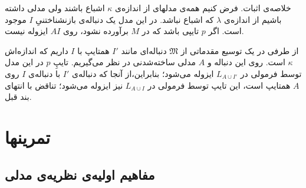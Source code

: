 \documentclass[12pt,a4paper]{report}
\theoremstyle{colorhead}
\begin{document}
	\begin{framed}
	خلاصه‌ی اثبات. فرض کنیم همه‌ی مدلهای از اندازه‌ی
	$\kappa$
	اشباع باشند ولی مدلی داشته باشیم از اندازه‌ی
	$\lambda$
که اشباع نباشد.
در این مدل یک دنباله‌ی بازنشناختنیِ 
$I$
موجود است. 
اگر
$p$
تایپی باشد که در
$M$
برآورده نشود، روی
$AI$
ایزوله نیست. 
\par 
از طرفی در یک توسیع مقدماتی از
$\mathfrak{M}$
دنباله‌ای
مانند 
$I'$
 همتایپ با
$I$
داریم که اندازه‌اش
$\kappa$
است. روی این دنباله و 
$A$
مدلی ساخته‌شدنی در نظر می‌گیریم. 
تایپِ
$p$
در این مدل توسط فرمولی در 
$L_{A\cup I'}$
ایزوله می‌شود؛
بنابراین،از آنجا که دنباله‌ی 
$I'$
با دنباله‌ی
$I$
روی 
$A$
همتایپ است،
 این تایپ توسط فرمولی در 
$L_{A\cup I}$
نیز
ایزوله می‌شود؛ تناقض با انتهای بند قبل.
	\end{framed}
	\chapter{تمرینها}
	\section{مفاهیم اولیه‌ی نظریه‌ی مدلی}
\end{document}
